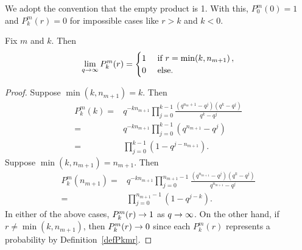\begin{remark}
  We adopt the convention that the empty product is 1. With this,
  $P^m_0(0) = 1$ and $P^m_k(r) = 0$ for impossible cases like $r>k$ and $k < 0$.
\end{remark}

\begin{lemma}
  \label{lem:Pqtoinfty}
  Fix $m$ and $k$. Then 
  \[
    \lim_{q \rightarrow \infty} P^m_k(r) = 
      \begin{cases}
        1 & \mbox{ if } r = \min(k,n_{m+1}) \, , \\
        0 & \mbox { else.}
      \end{cases}
    \]
\end{lemma}

\begin{proof}
  Suppose $\min(k,n_{m+1}) = k$. Then 
  \begin{align*} 
    P^m_k(k) =& q^{-kn_{m+1}}\prod_{j=0}^{k-1} \frac{(q^{n_m+1}-q^j) (q^k - q^j)}{q^k - q^j}  \\
    =& q^{-kn_{m+1}} \prod_{j=0}^{k-1}(q^{n_{m+1}} - q^j) \\
    =& \prod_{j=0}^{k-1} (1-q^{j-n_{m+1}}).
  \end{align*}
  Suppose $\min(k,n_{m+1}) = n_{m+1}$. Then
  \begin{align*}
    P^m_k(n_{m+1}) 
    =& q^{-kn_{m+1}}\prod_{j=0}^{n_{m+1}-1} \frac{(q^{n_{m+1}} - q^j)(q^k - q^j)}{q^{n_{m+1}} - q^j}    \\
    =&  \prod_{j=0}^{n_{m+1}-1}(1-q^{j-k}).
	\end{align*}
    In either of the above cases, $P^m_k(r) \rightarrow 1$ as $q \rightarrow \infty$. On the other hand, 
    if $r \neq \min(k,n_{m+1})$, then $P^m_k(r) \rightarrow 0$ since each $P^m_k(r)$ represents
    a probability by Definition~\ref{defPkmr}.
\end{proof}
